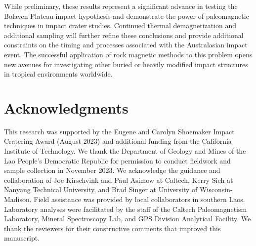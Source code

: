 \documentclass[twocolumn,11pt]{article}
\begin{document}
While preliminary, these results represent a significant advance in testing the Bolaven Plateau impact hypothesis and demonstrate the power of paleomagnetic techniques in impact crater studies. Continued thermal demagnetization and additional sampling will further refine these conclusions and provide additional constraints on the timing and processes associated with the Australasian impact event. The successful application of rock magnetic methods to this problem opens new avenues for investigating other buried or heavily modified impact structures in tropical environments worldwide.

\section{Acknowledgments}

This research was supported by the Eugene and Carolyn Shoemaker Impact Cratering Award (August 2023) and additional funding from the California Institute of Technology. We thank the Department of Geology and Mines of the Lao People's Democratic Republic for permission to conduct fieldwork and sample collection in November 2023. We acknowledge the guidance and collaboration of Joe Kirschvink and Paul Asimow at Caltech, Kerry Sieh at Nanyang Technical University, and Brad Singer at University of Wisconsin-Madison. Field assistance was provided by local collaborators in southern Laos. Laboratory analyses were facilitated by the staff of the Caltech Paleomagnetism Laboratory, Mineral Spectroscopy Lab, and GPS Division Analytical Facility. We thank the reviewers for their constructive comments that improved this manuscript.




\end{document}
